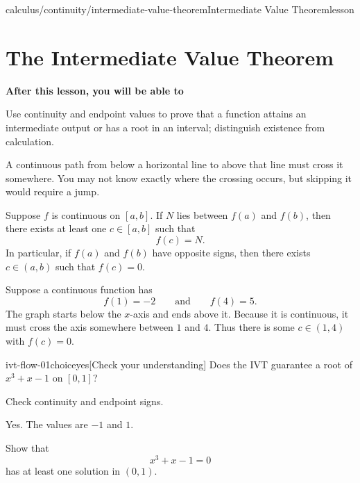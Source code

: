 \documentclass[11pt,openany]{book}
\theoremstyle{bgplain}
\newcounter{bgexample}[chapter]
\newcounter{bgcheck}[section]
\newcommand{\lessonobjective}[1]{%
  \par\Needspace{4\baselineskip}\addvspace{0.6em}%
  {\bfseries\color{BGInk}After this lesson, you will be able to}\par\smallskip
  #1\par\addvspace{0.5em}%
}
\begin{document}
\begin{webpage}{calculus/continuity/intermediate-value-theorem}{Intermediate Value Theorem}{lesson}
\section{The Intermediate Value Theorem}

\lessonobjective{
Use continuity and endpoint values to prove that a function attains an intermediate output or has a root in an interval; distinguish existence from calculation.
}

\begin{bgconcept}
A continuous path from below a horizontal line to above that line must cross it somewhere. You may not know exactly where the crossing occurs, but skipping it would require a jump.
\end{bgconcept}

\begin{bgtheorem}[title={Intermediate Value Theorem}]
Suppose \(f\) is continuous on \([a,b]\). If \(N\) lies between \(f(a)\) and \(f(b)\), then there exists at least one \(c\in[a,b]\) such that
\[
  \boxed{f(c)=N}.
\]
In particular, if \(f(a)\) and \(f(b)\) have opposite signs, then there exists \(c\in(a,b)\) such that \(f(c)=0\).
\end{bgtheorem}

\begin{bgguided}[title={Crossing ground level}]
Suppose a continuous function has
\[
  f(1)=-2
  \qquad\text{and}\qquad
  f(4)=5.
\]
The graph starts below the \(x\)-axis and ends above it. Because it is continuous, it must cross the axis somewhere between \(1\) and \(4\). Thus there is some \(c\in(1,4)\) with \(f(c)=0\).
\end{bgguided}


\begin{bgcheck}{ivt-flow-01}{choice}{yes}[Check your understanding]
Does the IVT guarantee a root of \(x^3+x-1\) on \([0,1]\)?
\begin{bghint}
Check continuity and endpoint signs.
\end{bghint}
\begin{bgreveal}
Yes. The values are \(-1\) and \(1\).
\end{bgreveal}
\end{bgcheck}



\begin{bgexample}[title={Prove a polynomial has a root}]
Show that
\[
  x^3+x-1=0
\]
has at least one solution in \((0,1)\).


\end{bgexample}
\end{webpage}
\end{document}
